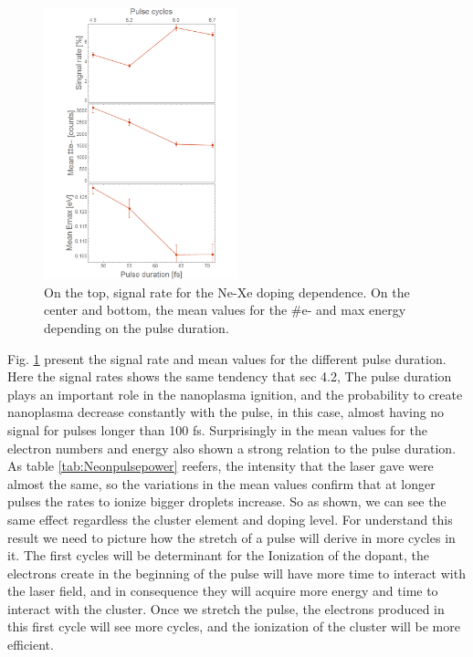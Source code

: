 \begin{figure}[hbtp]
\centering
\includegraphics[width=0.5\textwidth]{../Images/results/MIR_Ne_pulseduration/Alltogether.png}
\caption[MIR Ne pulse duration. Signal rate and mean values]{On the top, signal rate for the Ne-Xe doping dependence. On the center and bottom, the mean values for the $\#$e- and max energy depending on the pulse duration.}
\label{fig:Nepulseall}
\end{figure}

Fig. \ref{fig:Nepulseall} present the signal rate and mean values for the different pulse duration. Here the signal rates shows the same tendency that sec 4.2, The pulse duration plays an important role in the nanoplasma ignition, and the probability to create nanoplasma decrease constantly with the pulse, in this case, almost having no signal for pulses longer than 100 fs. Surprisingly in the mean values for the electron numbers and energy also shown a strong relation to the pulse duration. As table \ref{tab:Neonpulsepower} reefers, the intensity that the laser gave were almost the same, so the variations in the mean values confirm that at longer pulses the rates to ionize bigger droplets increase. So as shown, we can see the same effect regardless the cluster element and doping level. For understand this result we need to picture how the stretch of a pulse will derive in more cycles in it. The first cycles will be determinant for the Ionization of the dopant, the electrons create in the beginning of the pulse will have more time to interact with the laser field, and in consequence they will acquire more energy and time to interact with the cluster. Once we stretch the pulse, the electrons produced in this first cycle will see more cycles, and the ionization of the cluster will be more efficient. 






